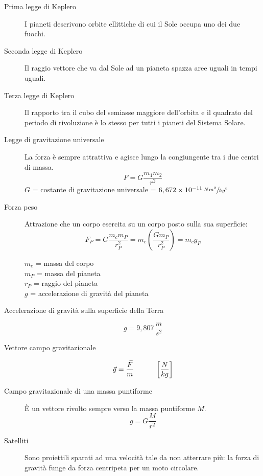 \documentclass[a4paper,11pt,italian]{article}
\begin{document}
\begin{description}
  \item[Prima legge di Keplero]  
  I pianeti descrivono orbite ellittiche di cui il Sole occupa uno dei due fuochi.
  
  \item[Seconda legge di Keplero] 
  Il raggio vettore che va dal Sole ad un pianeta spazza aree uguali in tempi uguali.
  
  \item[Terza legge di Keplero] 
  Il rapporto tra il cubo del semiasse maggiore dell'orbita e il quadrato del periodo di rivoluzione è lo stesso per tutti i pianeti del Sistema Solare.
  
  \item[Legge di gravitazione universale] 
  La forza è sempre attrattiva e agisce lungo la congiungente tra i due centri di massa. 
  \[ F = G \frac{m_1 m_2}{r^2} \]
  $ G $ = costante di gravitazione universale = $ 6,672 \times 10^{-11} \, \sfrac{Nm^2}{kg^2} $
  
  \item[Forza peso] 
  Attrazione che un corpo esercita su un corpo posto sulla sua superficie: 
  \[ F_P = G \frac{m_{c} m_{P}}{r^2_{P}} =  m_{c} \left(\frac{G m_{P}}{r^2_{P}} \right) = m_{c} g_P \]
  \begin{multicols}{2}
  $ m_c $ = massa del corpo\\
  $ m_P $ = massa del pianeta\\
  $ r_P $ = raggio del pianeta\\
  $ g $ = accelerazione di gravità del pianeta
  \end{multicols}
  
  \item[Accelerazione di gravità sulla superficie della Terra] 
  \[ g =  9, 807 \, \frac{m}{s^2} \]
  
  \item[Vettore campo gravitazionale] 
  \[ \vec{g} = \frac{\vec{F}}{m} \hspace*{3em} \left[ \frac{N}{kg} \right] \]
  
  \item[Campo gravitazionale di una massa puntiforme] 
  È un vettore rivolto sempre verso la massa puntiforme $ M $.
  \[ g = G \frac{M}{r^2} \]

  \item[Satelliti] Sono proiettili sparati ad una velocità tale da non atterrare più: la forza di gravità funge da forza centripeta per un moto circolare.
  

\end{description}
\end{document}
